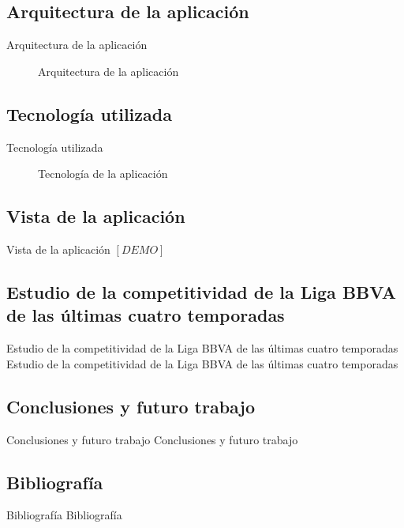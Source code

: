 \documentclass[11pt]{beamer}
\begin{document}
	\subsection{Arquitectura de la aplicación}
	
	\begin{frame}{Arquitectura de la aplicación}
		\begin{figure}
			\centering
			\resizebox{!}{0.7\textheight}{\arquitectura}
			\caption{Arquitectura de la aplicación}
			\label{fig:arquitectura}
		\end{figure}
	\end{frame}
	
	\subsection{Tecnología utilizada}
	
	\begin{frame}{Tecnología utilizada}
		\begin{figure}
			\centering
			\resizebox{!}{0.7\textheight}{\tecnologia}
			\caption{Tecnología de la aplicación}
			\label{fig:tecnologia}
		\end{figure}
	\end{frame}
	
	\subsection{Vista de la aplicación}
	
	\begin{frame}{Vista de la aplicación}
		$[DEMO]$
	\end{frame}
	
	\subsection{Estudio de la competitividad de la Liga BBVA de las últimas cuatro temporadas}
	
	\begin{frame}{Estudio de la competitividad de la Liga BBVA de las últimas cuatro temporadas}
		Estudio de la competitividad de la Liga BBVA de las últimas cuatro temporadas
	\end{frame}
	
	\subsection{Conclusiones y futuro trabajo}
	
	\begin{frame}{Conclusiones y futuro trabajo}
		Conclusiones y futuro trabajo
	\end{frame}
	
	\subsection{Bibliografía}
	
	\begin{frame}{Bibliografía}
		Bibliografía
	\end{frame}
	
	
	
\end{document}
